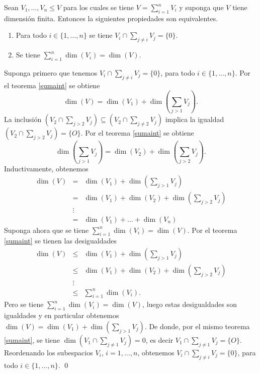 \begin{prop}
Sean $V_1,\ldots, V_n\le V$ para los cuales se tiene $V=\sum_{i=1}^n V_i$ y suponga que $V$ tiene dimensi\'on finita. Entonces la siguientes propiedades son equivalentes.
\begin{enumerate}
\item Para todo $i\in\{1,\ldots,n\}$ se tiene $V_i\cap\sum_{j\ne i} V_j=\{0\}$.
\item Se tiene $\sum_{i=1}^n \dim(V_i)=\dim(V)$.
\end{enumerate}
\end{prop}

\dem Suponga primero que tenemos $V_i\cap\sum_{j\ne i} V_j=\{0\}$, para todo $i\in\{1,\ldots,n\}$. Por el teorema \ref{sumaint} se obtiene
$$\dim(V)=\dim(V_1)+\dim\left(\sum_{j>1} V_j\right).$$
La inclusi\'on $\left(V_2\cap\sum_{j>2} V_j\right)\subseteq \left(V_2\cap\sum_{j\ne 2} V_j\right)$ implica la igualdad $\left(V_2\cap\sum_{j> 2} V_j\right)=\{O\}$. Por el teorema \ref{sumaint} se obtiene
$$\dim\left(\sum_{j>1} V_j\right)=\dim(V_2)+\dim\left(\sum_{j>2} V_j\right).$$
Inductivamente, obtenemos 
\begin{eqnarray*}
\dim(V) & = & \dim(V_1)+\dim\left(\sum_{j>1} V_j\right)\\
             & = & \dim(V_1)+\dim(V_2)+\dim\left(\sum_{j>2} V_j\right)\\
             & \vdots & \\
             & = & \dim(V_1)+\ldots+\dim(V_n)          
\end{eqnarray*}
Suponga ahora que se tiene $\sum_{i=1}^n \dim(V_i)=\dim(V)$. Por el teorema \ref{sumaint} se tienen las desigualdades
\begin{eqnarray*}
\dim(V) & \le & \dim(V_1)+\dim\left(\sum_{j>1} V_j\right)\\
             & \le & \dim(V_1)+\dim(V_2)+\dim\left(\sum_{j>2} V_j\right)\\
             & \vdots & \\
             & \le & \sum_{i=1}^n \dim(V_i).      
\end{eqnarray*}
Pero se tiene $\sum_{i=1}^n \dim(V_i)=\dim(V)$, luego estas desigualdades son igualdades y en particular obtenemos $\dim(V)=\dim(V_1)+\dim\left(\sum_{j>1} V_j\right)$. De donde, por el mismo teorema \ref{sumaint}, se tiene $\dim\left(V_1\cap\sum_{j\ne 1} V_j\right)=0$, es decir $V_1\cap\sum_{j\ne 1} V_j=\{O\}$. Reordenando los subespacios $V_i$, $i=1,\ldots,n$, obtenemos $V_i\cap\sum_{j\ne i} V_j=\{0\}$, para todo $i\in\{1,\ldots,n\}$. \qed

